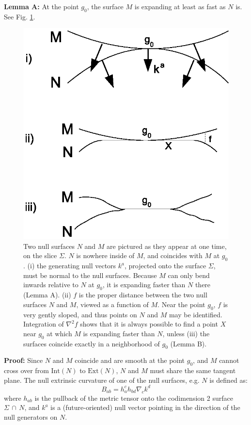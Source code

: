 \documentclass[12pt]{article}
\begin{document}
\textbf{Lemma A:} At the point $g_0$, the surface $M$ is expanding at least as fast as $N$ is.  See Fig. \ref{fronts}.
\begin{figure}[hbt]
\centering
\includegraphics[width=.6\textwidth]{fronts.eps}
\caption{\small{Two null surfaces $N$ and $M$ are pictured as they appear at one time, on the slice $\Sigma$.  $N$ is nowhere inside of $M$, and coincides with $M$ at $g_0$.  (i) the generating null vectors $k^a$, projected onto the surface $\Sigma$, must be normal to the null surfaces.  Because $M$ can only bend inwards relative to $N$ at $g_0$, it is expanding faster than $N$ there (Lemma A).  (ii) $f$ is the proper distance between the two null surfaces $N$ and $M$, viewed as a function of $M$.  Near the point $g_0$, $f$ is very gently sloped, and thus points on $N$ and $M$ may be identified.  Integration of $\nabla^2 f$ shows that it is always possible to find a point $X$ near $g_0$ at which $M$ is expanding faster than $N$, unless (iii) the surfaces coincide exactly in a neighborhood of $g_0$ (Lemma B).
}}\label{fronts}
\end{figure}

\textbf{Proof:} Since $N$ and $M$ coincide and are smooth at the point $g_0$, and $M$ cannot cross over from 
$\mathrm{Int}(N)$ to $\mathrm{Ext}(N)$, $N$ and $M$ must share the same tangent plane.  The null extrinsic curvature of one of the null surfaces, e.g. $N$ is defined as:
\begin{equation}\label{B}
B_{ab} = h^c_a h_{bd} \nabla_c k^d
\end{equation} 
where $h_{ab}$ is the pullback of the metric tensor onto the codimension 2 surface $\Sigma\,\cap\,N$, and $k^a$ is a (future-oriented) null vector pointing in the direction of the null generators on $N$.  
\end{document}
